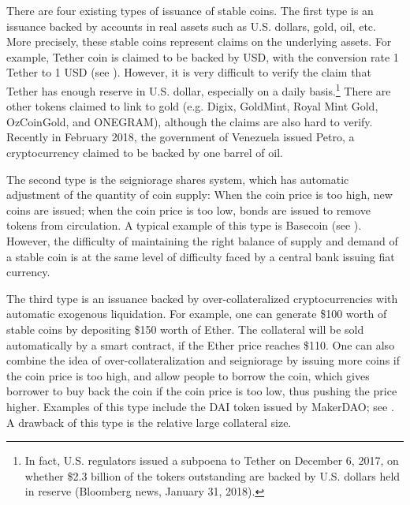 \documentclass[11pt]{article}%
\numberwithin{equation}{section}
\theoremstyle{plain}
\begin{document}




There are four existing types of issuance of stable coins. The first type is an issuance backed by accounts in real assets such as U.S. dollars, gold, oil, etc. More precisely, these stable coins represent claims on the underlying assets. For example, Tether coin is claimed to be backed by USD, with the conversion rate  1 Tether to 1 USD (see \cite{tether_tether:_2016}). However, it is very difficult to verify the claim that Tether has enough reserve in U.S. dollar, especially on a daily basis.\footnote{
In fact, U.S. regulators issued a subpoena to Tether on December 6, 2017, on whether \$2.3 billion of the tokers outstanding are backed by U.S. dollars held in reserve (Bloomberg news, January 31, 2018).}
There are other tokens claimed to link to gold (e.g. Digix, GoldMint, Royal Mint Gold, OzCoinGold, and ONEGRAM), although the claims are also hard to verify. Recently in February 2018, the government of Venezuela issued Petro, a cryptocurrency claimed to be backed by one barrel of oil.

The second type is the seigniorage shares system, which has automatic adjustment of the quantity of coin supply: When the coin price is too high, new coins are issued; when the coin price is too low, bonds are issued to remove tokens from circulation. A typical example of this type is Basecoin (see \cite{al-naji_basecoin:_2018}). However, the difficulty of maintaining the right balance of supply and demand of a stable coin is at the same level of difficulty faced by a central bank issuing fiat currency.

The third type is an issuance backed by over-collateralized cryptocurrencies with automatic exogenous liquidation. 
For example, one can generate \$100 worth of stable coins by depositing \$150 worth of Ether. The collateral will be sold automatically by a smart contract, if the Ether price reaches \$110. 
One can also combine the idea of over-collateralization and seigniorage by issuing more coins if the coin price is too high, and allow people to borrow the coin, which gives borrower to buy back the coin if the coin price is too low, thus pushing the price higher. 
Examples of this type include the DAI token issued by MakerDAO; see \cite{makerteam__2017}. A drawback of this type is the relative large collateral size.
\end{document}
